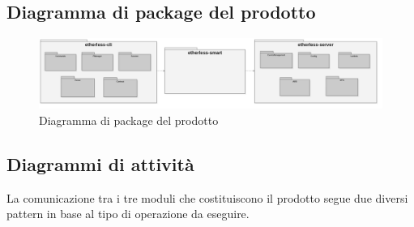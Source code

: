 	\begin{landscape}
		\subsection{Diagramma di package del prodotto}
		\begin{figure}[H]
			\centering
			\includegraphics[width=1.4\textwidth]{././diagrammi/generali/Etherless_package.png}
			\caption{Diagramma di package del prodotto}
		\end{figure}

	\end{landscape}
\newpage
\subsection{Diagrammi di attività}
	La comunicazione tra i tre moduli che costituiscono il prodotto segue due diversi pattern in base al tipo di operazione da eseguire.
